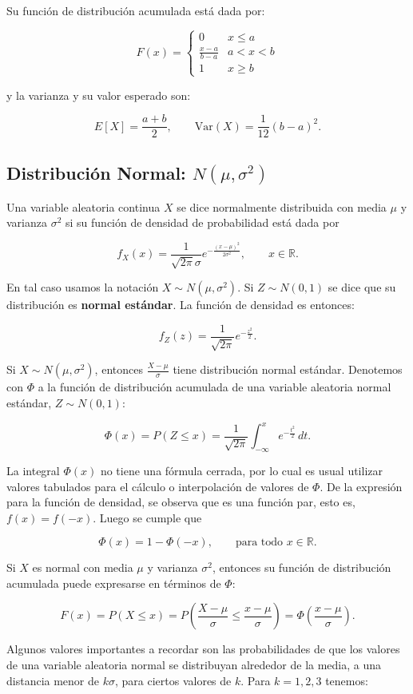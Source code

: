 \documentclass[11pt, a4paper]{article}
\theoremstyle{definition}
\begin{document}
Su función de distribución acumulada está dada por:

\[F(x)=\begin{cases}
0 & x\leq a \\
\frac{x-a}{b-a} & a<x<b \\
1 & x\geq b
\end{cases}\]

y la varianza y su valor esperado son:

\[E[X]=\frac{a+b}{2},\qquad \text{Var}(X)=\frac{1}{12}(b-a)^{2}.\]

\subsection*{Distribución Normal: $N(\mu,\sigma^2)$}
Una variable aleatoria continua $X$ se dice normalmente distribuida con media $\mu$ y varianza $\sigma^{2}$ si su función de densidad de probabilidad está dada por

\[f_{X}(x)=\frac{1}{\sqrt{2\pi}\sigma}e^{-\frac{(x-\mu)^{2}}{2\sigma^{2}}},\qquad x \in\mathbb{R}.\]

En tal caso usamos la notación $X\sim N(\mu,\sigma^2)$. Si $Z\sim N(0,1)$ se dice que su distribución es \textbf{normal estándar}. La función de densidad es entonces:

\[f_Z(z)=\frac{1}{\sqrt{2\pi}}e^{-\frac{z^2}{2}}.\]

Si $X\sim N(\mu,\sigma^2)$, entonces $\frac{X-\mu}{\sigma}$ tiene distribución normal estándar. Denotemos con $\Phi$ a la función de distribución acumulada de una variable aleatoria normal estándar, $Z\sim N(0,1)$:

\[\Phi(x)=P(Z\leq x)=\frac{1}{\sqrt{2\pi}}\int_{-\infty}^{x}e^{-\frac{t^{2}}{2}}\,dt.\tag{1.6} \] 

La integral $\Phi(x)$ no tiene una fórmula cerrada, por lo cual es usual utilizar valores tabulados para el cálculo o interpolación de valores de $\Phi$. De la expresión para la función de densidad, se observa que es una función par, esto es, $f(x)=f(-x)$. Luego se cumple que

\[\Phi(x)=1-\Phi(-x),\qquad\text{para todo }x\in\mathbb{R}.\]

Si $X$ es normal con media $\mu$ y varianza $\sigma^{2}$, entonces su función de distribución acumulada puede expresarse en términos de $\Phi$:

\[F(x)=P(X\leq x)=P\left(\frac{X-\mu}{\sigma}\leq\frac{x-\mu}{\sigma}\right)=\Phi\left(\frac{x-\mu}{\sigma}\right).\]

Algunos valores importantes a recordar son las probabilidades de que los valores de una variable aleatoria normal se distribuyan alrededor de la media, a una distancia menor de $k\sigma$, para ciertos valores de $k$. Para $k=1,2,3$ tenemos:
\end{document}
